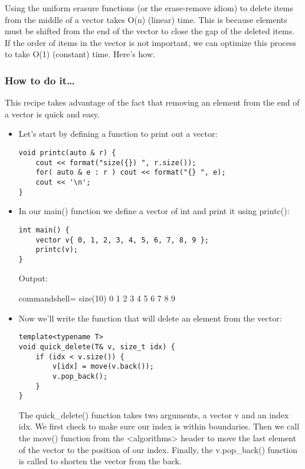 
Using the uniform erasure functions (or the erase-remove idiom) to delete items from the middle of a vector takes O(n) (linear) time. This is because elements must be shifted from the end of the vector to close the gap of the deleted items. If the order of items in the vector is not important, we can optimize this process to take O(1) (constant) time. Here's how.

\subsubsection{How to do it…}

This recipe takes advantage of the fact that removing an element from the end of a vector is quick and easy.

\begin{itemize}
\item 
Let's start by defining a function to print out a vector:

\begin{lstlisting}[style=styleCXX]
void printc(auto & r) {
	cout << format("size({}) ", r.size());
	for( auto & e : r ) cout << format("{} ", e);
	cout << '\n';
}
\end{lstlisting}

\item 
In our main() function we define a vector of int and print it using printc():

\begin{lstlisting}[style=styleCXX]
int main() {
	vector v{ 0, 1, 2, 3, 4, 5, 6, 7, 8, 9 };
	printc(v);
}
\end{lstlisting}

Output:

\begin{tcblisting}{commandshell={}}
size(10) 0 1 2 3 4 5 6 7 8 9
\end{tcblisting}

\item 
Now we'll write the function that will delete an element from the vector:

\begin{lstlisting}[style=styleCXX]
template<typename T>
void quick_delete(T& v, size_t idx) {
	if (idx < v.size()) {
		v[idx] = move(v.back());
		v.pop_back();
	}
}
\end{lstlisting}

The quick\_delete() function takes two arguments, a vector v and an index idx. We first check to make sure our index is within boundaries. Then we call the move() function from the <algorithms> header to move the last element of the vector to the position of our index. Finally, the v.pop\_back() function is called to shorten the vector from the back.


\end{itemize}
